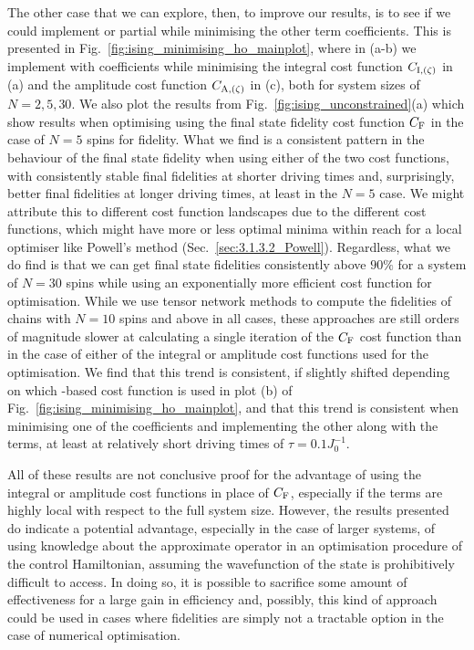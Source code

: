 The other case that we can explore, then, to improve our results, is to see if we could implement  or partial   while minimising the other  term coefficients. This is presented in Fig.~\ref{fig:ising_minimising_ho_mainplot}, where in (a-b) we implement  with   coefficients while minimising the integral cost function $C_{\rm I, (\zeta)}$ in (a) and the amplitude cost function $C_{\rm A, (\zeta)}$ in (c), both for system sizes of $N = 2, 5, 30$. We also plot the results from Fig.~\ref{fig:ising_unconstrained}(a) which show results when optimising  using the final state fidelity cost function $C_{\rm F}$ in the case of $N = 5$ spins for fidelity. What we find is a consistent pattern in the behaviour of the final state fidelity when using either of the two cost functions, with consistently stable final fidelities at shorter driving times and, surprisingly, better final fidelities at longer driving times, at least in the $N=5$ case. We might attribute this to different cost function landscapes due to the different cost functions, which might have more or less optimal minima within reach for a local optimiser like Powell's method (Sec.~\ref{sec:3.1.3.2_Powell}). Regardless, what we do find is that we can get final state fidelities consistently above $90\%$ for a system of $N=30$ spins while using an exponentially more efficient cost function for optimisation. While we use tensor network methods to compute the fidelities of chains with $N=10$ spins and above in all cases, these approaches are still orders of magnitude slower at calculating a single iteration of the $C_{\rm F}$ cost function than in the case of  either of the integral or amplitude cost functions used for the optimisation. We find that this trend is consistent, if slightly shifted depending on which -based cost function is used in plot (b) of Fig.~\ref{fig:ising_minimising_ho_mainplot}, and that this trend is consistent when minimising one of the  coefficients and implementing the other along with the  terms, at least at relatively short driving times of $\tau = 0.1J_0^{-1}$.

All of these results are not conclusive proof for the advantage of using the integral or amplitude cost functions in place of $C_{\rm F}$, especially if the  terms are highly local with respect to the full system size. However, the results presented do indicate a potential advantage, especially in the case of larger systems, of using knowledge about the approximate  operator in an optimisation procedure of the control Hamiltonian, assuming the wavefunction of the state is prohibitively difficult to access. In doing so, it is possible to sacrifice some amount of effectiveness for a large gain in efficiency and, possibly, this kind of approach could be used in cases where fidelities are simply not a tractable option in the case of numerical optimisation.

